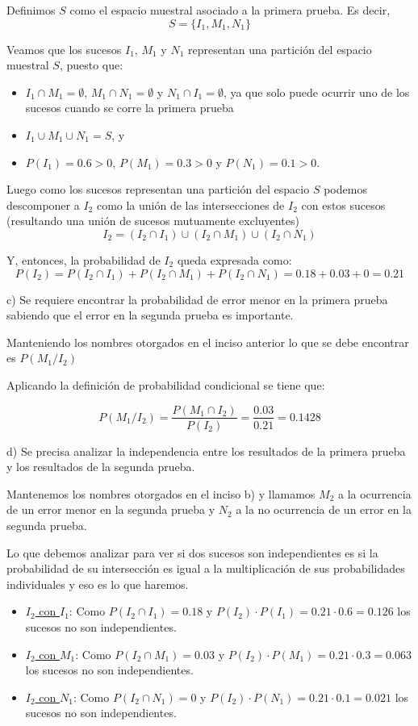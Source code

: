 \documentclass[11pt]{article}
\begin{document}
Definimos $S$ como el espacio muestral asociado a la primera prueba.
Es decir, 
\[S=\{I_{1},M_{1},N_{1}\}\]

Veamos que los sucesos $I_{1}$, $M_{1}$ y $N_{1}$ representan una partición del espacio muestral $S$, puesto que: 
\begin{itemize}
    \item $I_{1} \cap  M_{1} = \emptyset$, $M_{1} \cap N_{1} = \emptyset$ y $N_{1} \cap I_{1} = \emptyset$, ya que solo puede ocurrir uno de los sucesos cuando se corre la primera prueba
    \item $I_{1} \cup M_{1} \cup N_{1} = S$, y
    \item $P(I_{1}) = 0.6 > 0$, $P(M_{1}) = 0.3 > 0$ y $P(N_{1}) = 0.1 > 0$. 
\end{itemize}

Luego como los sucesos representan una partici\'on del espacio $S$ podemos descomponer a $I_{2}$ como la uni\'on de las intersecciones de $I_{2}$ con estos sucesos (resultando una uni\'on de sucesos mutuamente excluyentes)
\[I_{2} = (I_{2} \cap I_{1}) \cup (I_{2} \cap M_{1}) \cup (I_{2} \cap N_{1}) \]

Y, entonces, la probabilidad de $I_{2}$ queda expresada como: 
\[P(I_{2}) = P(I_{2}\cap I_{1}) + P(I_{2}\cap M_{1}) + P(I_{2}\cap N_{1}) = 0.18 + 0.03 + 0 = 0.21 \]


c) Se requiere encontrar la probabilidad de error menor en la primera prueba sabiendo que el
error en la segunda prueba es importante.

Manteniendo los nombres otorgados en el inciso anterior lo que se debe encontrar es $P(M_{1}/I_{2})$

Aplicando la definici\'on de probabilidad condicional se tiene que:

\[P(M_{1}/I_{2}) = \frac{P(M_{1}\cap I_{2})}{P(I_{2})} = \frac{0.03}{0.21} = 0.1428\]

d) Se precisa analizar la independencia entre los resultados de la primera prueba y los resultados de la segunda prueba. 

Mantenemos los nombres otorgados en el inciso b) y llamamos $M_{2}$ a la ocurrencia de un error menor en la segunda prueba y $N_{2}$ a la no ocurrencia de un error en la segunda prueba. 

Lo que debemos analizar para ver si dos sucesos son independientes es si la probabilidad de su intersección es igual a la multiplicación de sus probabilidades individuales y eso es lo que haremos. 

\begin{itemize}
    \item \underline{$I_{2}$ con $I_{1}$}: Como $P(I_{2}\cap I_{1}) = 0.18$ y $P(I_{2})\cdot P(I_{1}) = 0.21\cdot 0.6 = 0.126$ los sucesos no son independientes. 
    \item \underline{$I_{2}$ con $M_{1}$}: Como $P(I_{2}\cap M_{1}) = 0.03$ y $P(I_{2})\cdot P(M_{1}) = 0.21\cdot 0.3 = 0.063$ los sucesos no son independientes. 
    \item \underline{$I_{2}$ con $N_{1}$}: Como $P(I_{2}\cap N_{1}) = 0$ y $P(I_{2})\cdot P(N_{1}) = 0.21\cdot 0.1 = 0.021$ los sucesos no son independientes. 
\end{itemize}
\end{document}

